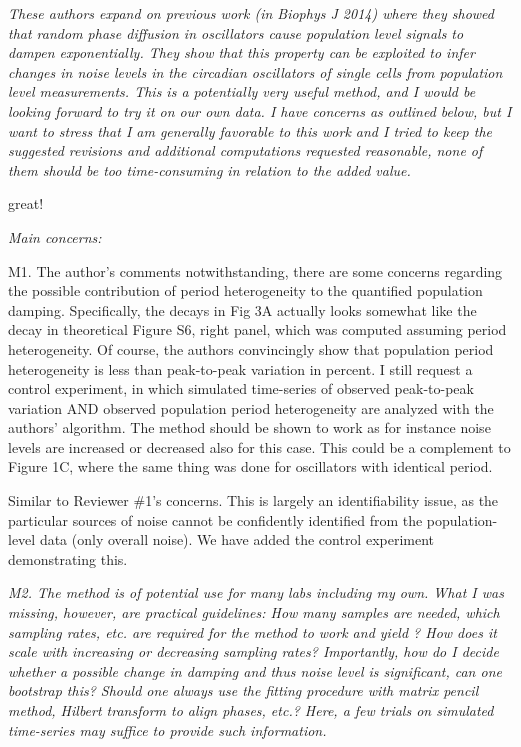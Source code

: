 \documentclass[11pt, letterpaper]{article}
\newenvironment{reviewer}{\itshape\color{gray}}{}
\begin{document}
\begin{reviewer}
These authors expand on previous work (in Biophys J 2014) where they showed that random phase diffusion in oscillators cause population level signals to dampen exponentially. They show that this property can be exploited to infer changes in noise levels in the circadian oscillators of single cells from population level measurements. This is a potentially very useful method, and I would be looking forward to try it on our own data. I have concerns as outlined below, but I want to stress that I am generally favorable to this work and I tried to keep the suggested revisions and additional computations requested reasonable, none of them should be too time-consuming in relation to the added value.
\end{reviewer}

great!

\begin{reviewer}
Main concerns:

M1. The author's comments notwithstanding, there are some concerns regarding the possible contribution of period heterogeneity to the quantified population damping. Specifically, the decays in Fig 3A actually looks somewhat like the decay in theoretical Figure S6, right panel, which was computed assuming period heterogeneity. Of course, the authors convincingly show that population period heterogeneity is less than peak-to-peak variation in percent. I still request a control experiment, in which simulated time-series of observed peak-to-peak variation AND observed population period heterogeneity are analyzed with the authors' algorithm. The method should be shown to work as for instance noise levels are increased or decreased also for this case. This could be a complement to Figure 1C, where the same thing was done for oscillators with identical period.
\end{reviewer}

Similar to Reviewer \#1's concerns. This is largely an identifiability issue, as the particular sources of noise cannot be confidently identified from the population-level data (only overall noise).
We have added the control experiment demonstrating this.

\begin{reviewer}
M2. The method is of potential use for many labs including my own. What I was missing, however, are practical guidelines: How many samples are needed, which sampling rates, etc. are required for the method to work and yield ? How does it scale with increasing or decreasing sampling rates? Importantly, how do I decide whether a possible change in damping and thus noise level is significant, can one bootstrap this? Should one always use the fitting procedure with matrix pencil method, Hilbert transform to align phases, etc.? Here, a few trials on simulated time-series may suffice to provide such information.
\end{reviewer}
\end{document}
